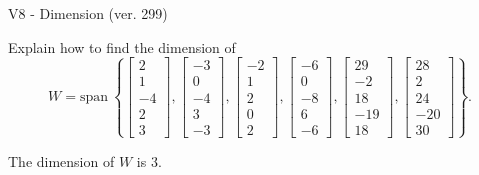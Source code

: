 \begin{exercise}
  \begin{exerciseTitle}V8 - Dimension (ver. 299)\end{exerciseTitle}
  \begin{exerciseStatement}
    Explain how to find the dimension of 
\[W=\mathrm{span}\ \left\{\left[\begin{array}{r}
2 \\
1 \\
-4 \\
2 \\
3
\end{array}\right] , \left[\begin{array}{r}
-3 \\
0 \\
-4 \\
3 \\
-3
\end{array}\right] , \left[\begin{array}{r}
-2 \\
1 \\
2 \\
0 \\
2
\end{array}\right] , \left[\begin{array}{r}
-6 \\
0 \\
-8 \\
6 \\
-6
\end{array}\right] , \left[\begin{array}{r}
29 \\
-2 \\
18 \\
-19 \\
18
\end{array}\right] , \left[\begin{array}{r}
28 \\
2 \\
24 \\
-20 \\
30
\end{array}\right]\right\}.\]



  \end{exerciseStatement}
  \begin{exerciseAnswer}
   The dimension of \(W\) is  \(3\).
  


  \end{exerciseAnswer}
\end{exercise}
